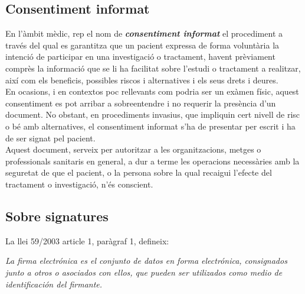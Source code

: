 \subsection{Consentiment informat}
En l'àmbit mèdic, rep el nom de \textit{\textbf{consentiment informat}} el procediment a través del qual es garantitza que un pacient expressa de forma voluntària la intenció de participar en una investigació o tractament, havent prèviament comprès la informació que se li ha facilitat sobre l'estudi o tractament a realitzar, així com els beneficis, possibles riscos i alternatives i els seus drets i deures.\\
\newline En ocasions, i en contextos poc rellevants com podria ser un exàmen físic, aquest consentiment es pot arribar a sobreentendre i no requerir la presència d'un document. No obstant, en procediments invasius, que impliquin cert nivell de risc o bé amb alternatives, el consentiment informat s'ha de presentar per escrit i ha de ser signat pel pacient.\\
\newline Aquest document, serveix per autoritzar a les organitzacions, metges o professionals sanitaris en general, a dur a terme les operacions necessàries amb la seguretat de que el pacient, o la persona sobre la qual recaigui l'efecte del tractament o investigació, n'és conscient.

\subsection{Sobre signatures}
La llei 59/2003 article 1, paràgraf 1, defineix:
\begin{displayquote}
\textit{La firma electrónica es el conjunto de datos en forma electrónica, consignados junto a otros o asociados con ellos, que pueden ser utilizados como medio de identificación del firmante.}
\end{displayquote}

